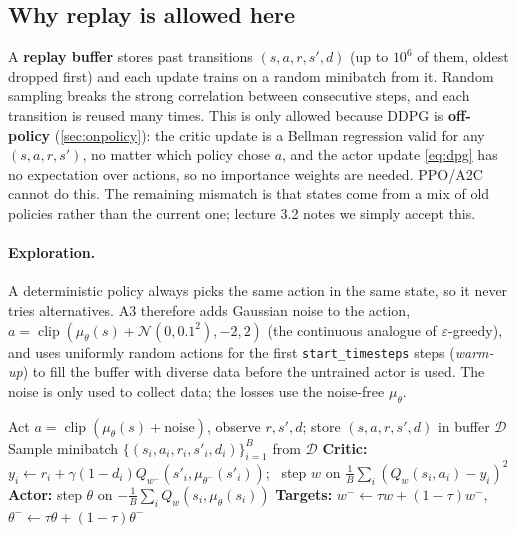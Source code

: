 \documentclass[11pt,a4paper]{article}
\DeclareMathOperator{\clip}{clip}
\newcommand{\code}[1]{\texttt{#1}}
\begin{document}
\subsection{Why replay is allowed here}
A \textbf{replay buffer} stores past transitions $(s,a,r,s',d)$ (up to $10^6$ of them, oldest dropped first) and each update trains on a random minibatch from it. Random sampling breaks the strong correlation between consecutive steps, and each transition is reused many times.
This is only allowed because DDPG is \textbf{off-policy} (\cref{sec:onpolicy}): the critic update is a Bellman regression valid for any $(s,a,r,s')$, no matter which policy chose $a$, and the actor update \eqref{eq:dpg} has no expectation over actions, so no importance weights are needed. PPO/A2C cannot do this. The remaining mismatch is that states come from a mix of old policies rather than the current one; lecture 3.2 notes we simply accept this.

\paragraph{Exploration.} A deterministic policy always picks the same action in the same state, so it never tries alternatives. A3 therefore adds Gaussian noise to the action, $a=\clip(\mu_\theta(s)+\mathcal N(0,0.1^2),-2,2)$ (the continuous analogue of $\varepsilon$-greedy), and uses uniformly random actions for the first \code{start\_timesteps} steps (\emph{warm-up}) to fill the buffer with diverse data before the untrained actor is used. The noise is only used to collect data; the losses use the noise-free $\mu_\theta$.

\begin{algorithm}[H]
\caption{DDPG (one environment step), matching the A3 loop}
\begin{algorithmic}[1]
\State Act $a=\operatorname{clip}(\mu_\theta(s)+\text{noise})$, observe $r,s',d$; store $(s,a,r,s',d)$ in buffer $\mathcal D$
\State Sample minibatch $\{(s_i,a_i,r_i,s'_i,d_i)\}_{i=1}^B$ from $\mathcal D$
\State \textbf{Critic:} $y_i\gets r_i+\gamma(1-d_i)Q_{w^-}(s'_i,\mu_{\theta^-}(s'_i))$; \ step $w$ on $\frac1B\sum_i(Q_w(s_i,a_i)-y_i)^2$ 
\State \textbf{Actor:} step $\theta$ on $-\frac1B\sum_i Q_w(s_i,\mu_\theta(s_i))$ 
\State \textbf{Targets:} $w^-\gets\tau w+(1-\tau)w^-$, \ $\theta^-\gets\tau\theta+(1-\tau)\theta^-$
\end{algorithmic}
\end{algorithm}
\end{document}
